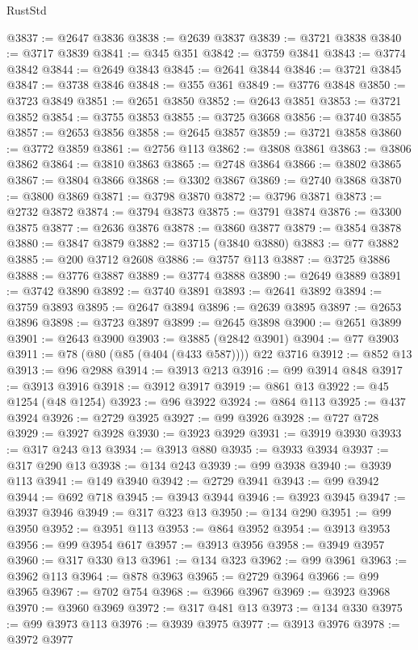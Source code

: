 \begin{lexlean}{RustStd}
\begin{coremodule}
@3837 := @2647 @3836
@3838 := @2639 @3837
@3839 := @3721 @3838
@3840 := @3717 @3839
@3841 := @345 @351
@3842 := @3759 @3841
@3843 := @3774 @3842
@3844 := @2649 @3843
@3845 := @2641 @3844
@3846 := @3721 @3845
@3847 := @3738 @3846
@3848 := @355 @361
@3849 := @3776 @3848
@3850 := @3723 @3849
@3851 := @2651 @3850
@3852 := @2643 @3851
@3853 := @3721 @3852
@3854 := @3755 @3853
@3855 := @3725 @3668
@3856 := @3740 @3855
@3857 := @2653 @3856
@3858 := @2645 @3857
@3859 := @3721 @3858
@3860 := @3772 @3859
@3861 := @2756 @113
@3862 := @3808 @3861
@3863 := @3806 @3862
@3864 := @3810 @3863
@3865 := @2748 @3864
@3866 := @3802 @3865
@3867 := @3804 @3866
@3868 := @3302 @3867
@3869 := @2740 @3868
@3870 := @3800 @3869
@3871 := @3798 @3870
@3872 := @3796 @3871
@3873 := @2732 @3872
@3874 := @3794 @3873
@3875 := @3791 @3874
@3876 := @3300 @3875
@3877 := @2636 @3876
@3878 := @3860 @3877
@3879 := @3854 @3878
@3880 := @3847 @3879
@3882 := @3715 (@3840 @3880)
@3883 := @77 @3882
@3885 := @200 @3712 @2608
@3886 := @3757 @113
@3887 := @3725 @3886
@3888 := @3776 @3887
@3889 := @3774 @3888
@3890 := @2649 @3889
@3891 := @3742 @3890
@3892 := @3740 @3891
@3893 := @2641 @3892
@3894 := @3759 @3893
@3895 := @2647 @3894
@3896 := @2639 @3895
@3897 := @2653 @3896
@3898 := @3723 @3897
@3899 := @2645 @3898
@3900 := @2651 @3899
@3901 := @2643 @3900
@3903 := @3885 (@2842 @3901)
@3904 := @77 @3903
@3911 := @78 (@80 (@85 (@404 (@433 @587)))) @22 @3716
@3912 := @852 @13
@3913 := @96 @2988
@3914 := @3913 @213
@3916 := @99 @3914 @848
@3917 := @3913 @3916
@3918 := @3912 @3917
@3919 := @861 @13
@3922 := @45 @1254 (@48 @1254)
@3923 := @96 @3922
@3924 := @864 @113
@3925 := @437 @3924
@3926 := @2729 @3925
@3927 := @99 @3926
@3928 := @727 @728
@3929 := @3927 @3928
@3930 := @3923 @3929
@3931 := @3919 @3930
@3933 := @317 @243 @13
@3934 := @3913 @880
@3935 := @3933 @3934
@3937 := @317 @290 @13
@3938 := @134 @243
@3939 := @99 @3938
@3940 := @3939 @113
@3941 := @149 @3940
@3942 := @2729 @3941
@3943 := @99 @3942
@3944 := @692 @718
@3945 := @3943 @3944
@3946 := @3923 @3945
@3947 := @3937 @3946
@3949 := @317 @323 @13
@3950 := @134 @290
@3951 := @99 @3950
@3952 := @3951 @113
@3953 := @864 @3952
@3954 := @3913 @3953
@3956 := @99 @3954 @617
@3957 := @3913 @3956
@3958 := @3949 @3957
@3960 := @317 @330 @13
@3961 := @134 @323
@3962 := @99 @3961
@3963 := @3962 @113
@3964 := @878 @3963
@3965 := @2729 @3964
@3966 := @99 @3965
@3967 := @702 @754
@3968 := @3966 @3967
@3969 := @3923 @3968
@3970 := @3960 @3969
@3972 := @317 @481 @13
@3973 := @134 @330
@3975 := @99 @3973 @113
@3976 := @3939 @3975
@3977 := @3913 @3976
@3978 := @3972 @3977

\end{coremodule}
\end{lexlean}
